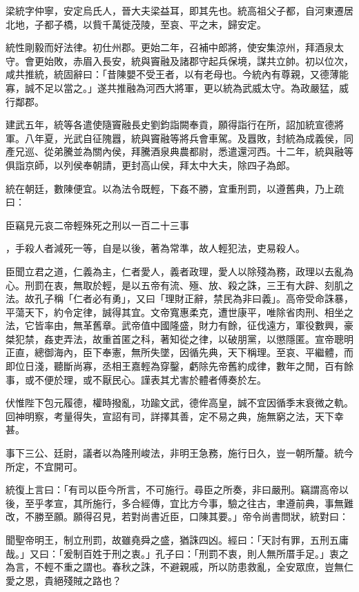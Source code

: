 
\begin{pinyinscope}
梁統字仲寧，安定烏氏人，晉大夫梁益耳，即其先也。統高祖父子都，自河東遷居北地，子都子橋，以貲千萬徙茂陵，至哀、平之末，歸安定。

統性剛毅而好法律。初仕州郡。更始二年，召補中郎將，使安集涼州，拜酒泉太守。會更始敗，赤眉入長安，統與竇融及諸郡守起兵保境，謀共立帥。初以位次，咸共推統，統固辭曰：「昔陳嬰不受王者，以有老母也。今統內有尊親，又德薄能寡，誠不足以當之。」遂共推融為河西大將軍，更以統為武威太守。為政嚴猛，威行鄰郡。

建武五年，統等各遣使隨竇融長史劉鈞詣闕奉貢，願得詣行在所，詔加統宣德將軍。八年夏，光武自征隗囂，統與竇融等將兵會車駕。及囂敗，封統為成義侯，同產兄巡、從弟騰並為關內侯，拜騰酒泉典農都尉，悉遣還河西。十二年，統與融等俱詣京師，以列侯奉朝請，更封高山侯，拜太中大夫，除四子為郎。

統在朝廷，數陳便宜。以為法令既輕，下姦不勝，宜重刑罰，以遵舊典，乃上疏曰：

臣竊見元哀二帝輕殊死之刑以一百二十三事

，手殺人者減死一等，自是以後，著為常準，故人輕犯法，吏易殺人。

臣聞立君之道，仁義為主，仁者愛人，義者政理，愛人以除殘為務，政理以去亂為心。刑罰在衷，無取於輕，是以五帝有流、殛、放、殺之誅，三王有大辟、刻肌之法。故孔子稱「仁者必有勇」，又曰「理財正辭，禁民為非曰義」。高帝受命誅暴，平蕩天下，約令定律，誠得其宜。文帝寬惠柔克，遭世康平，唯除省肉刑、相坐之法，它皆率由，無革舊章。武帝值中國隆盛，財力有餘，征伐遠方，軍役數興，豪桀犯禁，姦吏弄法，故重首匿之科，著知從之律，以破朋黨，以懲隱匿。宣帝聰明正直，總御海內，臣下奉憲，無所失墜，因循先典，天下稱理。至哀、平繼體，而即位日淺，聽斷尚寡，丞相王嘉輕為穿鑿，虧除先帝舊約成律，數年之閒，百有餘事，或不便於理，或不厭民心。謹表其尤害於體者傅奏於左。

伏惟陛下包元履德，權時撥亂，功踰文武，德侔高皇，誠不宜因循季末衰微之軌。回神明察，考量得失，宣詔有司，詳擇其善，定不易之典，施無窮之法，天下幸甚。

事下三公、廷尉，議者以為隆刑峻法，非明王急務，施行日久，豈一朝所釐。統今所定，不宜開可。

統復上言曰：「有司以臣今所言，不可施行。尋臣之所奏，非曰嚴刑。竊謂高帝以後，至乎孝宣，其所施行，多合經傳，宜比方今事，驗之往古，聿遵前典，事無難改，不勝至願。願得召見，若對尚書近臣，口陳其要。」帝令尚書問狀，統對曰：

聞聖帝明王，制立刑罰，故雖堯舜之盛，猶誅四凶。經曰：「天討有罪，五刑五庸哉。」又曰：「爰制百姓于刑之衷。」孔子曰：「刑罰不衷，則人無所厝手足。」衷之為言，不輕不重之謂也。春秋之誅，不避親戚，所以防患救亂，全安眾庶，豈無仁愛之恩，貴絕殘賊之路也？


\end{pinyinscope}
